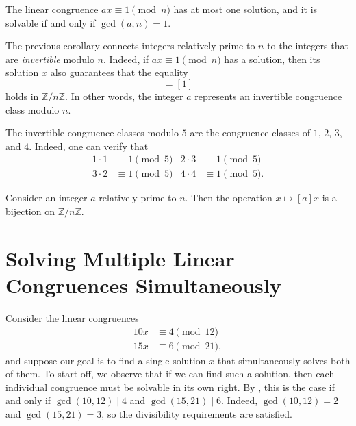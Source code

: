 \begin{corollary}
  The linear congruence $ax\equiv 1\pmod{n}$ has at most one solution, and it is solvable if and only if $\gcd(a,n)=1$.
\end{corollary}

The previous corollary connects integers relatively prime to $n$ to the integers that are \emph{invertible} modulo $n$. Indeed, if $ax\equiv 1\pmod{n}$ has a solution, then its solution $x$ also guarantees that the equality
\begin{equation*}
  [a][x]=[1]
\end{equation*}
holds in $\mathbb{Z}/n\mathbb{Z}$. In other words, the integer $a$ represents an invertible congruence class modulo $n$.

\begin{example}
  The invertible congruence classes modulo $5$ are the congruence classes of $1$, $2$, $3$, and $4$. Indeed, one can verify that
  \begin{align*}
    1\cdot 1 & \equiv 1\pmod{5} & 2\cdot 3 & \equiv 1\pmod{5} \\
    3\cdot 2 & \equiv 1\pmod{5} & 4\cdot 4 & \equiv 1\pmod {5}.
  \end{align*}
\end{example}

\begin{corollary}
  Consider an integer $a$ relatively prime to $n$. Then the operation $x\mapsto [a]x$ is a bijection on $\mathbb{Z}/n\mathbb{Z}$.
\end{corollary}

\section{Solving Multiple Linear Congruences Simultaneously}

Consider the linear congruences
\begin{align*}
  10x & \equiv 4 \pmod{12} \\
  15x & \equiv 6 \pmod{21},
\end{align*}
and suppose our goal is to find a single solution $x$ that simultaneously solves both of them. To start off, we observe that if we can find such a solution, then each individual congruence must be solvable in its own right. By , this is the case if and only if $\gcd(10,12)\mid 4$ and $\gcd(15,21)\mid 6$. Indeed, $\gcd(10,12)=2$ and $\gcd(15,21)=3$, so the divisibility requirements are satisfied.

